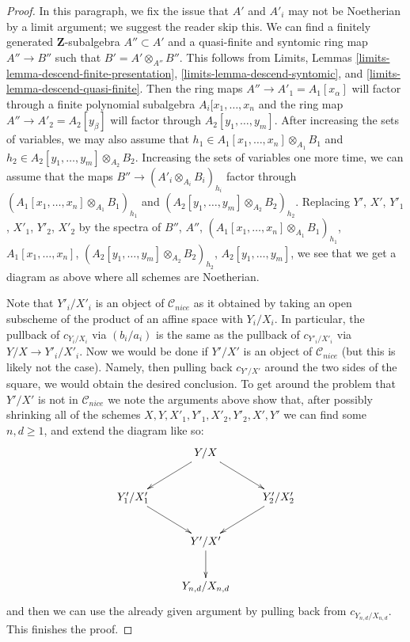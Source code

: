 \documentclass{stacks-project}
\theoremstyle{plain}
\theoremstyle{definition}
\theoremstyle{remark}
\numberwithin{equation}{subsection}
\begin{document}
\begin{proof}
\medskip\noindent
In this paragraph, we fix the issue that $A'$ and $A'_i$ may not be Noetherian
by a limit argument; we suggest the reader skip this.
We can find a finitely generated $\mathbf{Z}$-subalgebra
$A'' \subset A'$ and a quasi-finite and syntomic ring map
$A'' \to B''$ such that $B' = A' \otimes_{A''} B''$.
This follows from Limits, Lemmas
\ref{limits-lemma-descend-finite-presentation},
\ref{limits-lemma-descend-syntomic}, and
\ref{limits-lemma-descend-quasi-finite}.
Then the ring maps $A'' \to A'_1 = A_1[x_\alpha]$ will factor through a finite
polynomial subalgebra $A_i[x_1, \ldots, x_n$ and the ring map
$A'' \to A'_2 = A_2[y_\beta]$ will factor through $A_2[y_1, \ldots, y_m]$.
After increasing the sets of variables, we may also assume that
$h_1 \in A_1[x_1, \ldots, x_n] \otimes_{A_1} B_1$ and
$h_2 \in A_2[y_1, \ldots, y_m] \otimes_{A_2} B_2$.
Increasing the sets of variables one more time, we can assume
that the maps $B'' \to (A'_i \otimes_{A_i} B_i)_{h_i}$
factor through $(A_1[x_1, \ldots, x_n] \otimes_{A_1} B_1)_{h_1}$
and $(A_2[y_1, \ldots, y_m] \otimes_{A_2} B_2)_{h_2}$.
Replacing $Y'$, $X'$, $Y'_1$, $X'_1$, $Y'_2$, $X'_2$ by the spectra of
$B''$, $A''$, $(A_1[x_1, \ldots, x_n] \otimes_{A_1} B_1)_{h_1}$,
$A_1[x_1, \ldots, x_n]$, $(A_2[y_1, \ldots, y_m] \otimes_{A_2} B_2)_{h_2}$,
$A_2[y_1, \ldots, y_m]$, we see that we get a diagram as above
where all schemes are Noetherian.

\medskip\noindent
Note that $Y'_i/X'_i$ is an object of $\mathcal{C}_{nice}$ as it
obtained by taking an open subscheme of the product of an affine space
with $Y_i/X_i$. In particular, the pullback of
$c_{Y_i/X_i}$ via $(b_i/a_i)$ is the same as the pullback of
$c_{Y'_i/X'_i}$ via $Y/X \to Y'_i/X'_i$.
Now we would be done if $Y'/X'$ is an object of $\mathcal{C}_{nice}$
(but this is likely not the case). Namely, then pulling back $c_{Y'/X'}$
around the two sides of the square, we would obtain the desired conclusion.
To get around the problem that $Y'/X'$ is not in $\mathcal{C}_{nice}$
we note the arguments above show that, after possibly shrinking all
of the schemes $X, Y, X'_1, Y'_1, X'_2, Y'_2, X', Y'$ we can find some
$n, d \geq 1$, and extend the diagram like so:
$$
\xymatrix{
& Y/X \ar[ld] \ar[rd] \\
Y'_1/X'_1 \ar[rd] & & Y'_2/X'_2 \ar[ld] \\
& Y'/X' \ar[d] \\
& Y_{n, d}/X_{n, d}
}
$$
and then we can use the already given argument by pulling
back from $c_{Y_{n, d}/X_{n, d}}$. This finishes the proof.
\end{proof}
\end{document}
